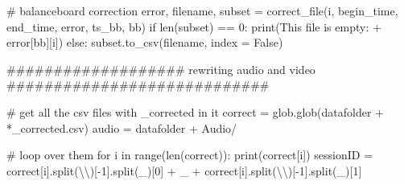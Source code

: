 \documentclass[
  letterpaper,
  DIV=11,
  numbers=noendperiod]{scrreprt}
\newenvironment{Shaded}{\begin{snugshade}}{\end{snugshade}}
\newcommand{\BuiltInTok}[1]{\textcolor[rgb]{0.00,0.23,0.31}{#1}}
\newcommand{\CharTok}[1]{\textcolor[rgb]{0.13,0.47,0.30}{#1}}
\newcommand{\CommentTok}[1]{\textcolor[rgb]{0.37,0.37,0.37}{#1}}
\newcommand{\ControlFlowTok}[1]{\textcolor[rgb]{0.00,0.23,0.31}{#1}}
\newcommand{\DecValTok}[1]{\textcolor[rgb]{0.68,0.00,0.00}{#1}}
\newcommand{\KeywordTok}[1]{\textcolor[rgb]{0.00,0.23,0.31}{#1}}
\newcommand{\NormalTok}[1]{\textcolor[rgb]{0.00,0.23,0.31}{#1}}
\newcommand{\OperatorTok}[1]{\textcolor[rgb]{0.37,0.37,0.37}{#1}}
\newcommand{\StringTok}[1]{\textcolor[rgb]{0.13,0.47,0.30}{#1}}
\newcommand{\VariableTok}[1]{\textcolor[rgb]{0.07,0.07,0.07}{#1}}
\begin{document}
\begin{Shaded}
\begin{Highlighting}[]
        \CommentTok{\# balanceboard correction}
\NormalTok{        error, filename, subset }\OperatorTok{=}\NormalTok{ correct\_file(i, begin\_time, end\_time, error, ts\_bb, }\StringTok{\textquotesingle{}bb\textquotesingle{}}\NormalTok{)}
        \ControlFlowTok{if} \BuiltInTok{len}\NormalTok{(subset) }\OperatorTok{==} \DecValTok{0}\NormalTok{:}
            \BuiltInTok{print}\NormalTok{(}\StringTok{\textquotesingle{}This file is empty: \textquotesingle{}} \OperatorTok{+}\NormalTok{ error[}\StringTok{\textquotesingle{}bb\textquotesingle{}}\NormalTok{][i])}
        \ControlFlowTok{else}\NormalTok{:}
\NormalTok{            subset.to\_csv(filename, index }\OperatorTok{=} \VariableTok{False}\NormalTok{)}
    
    \CommentTok{\#\#\#\#\#\#\#\#\#\#\#\#\#\#\#\#\#\#\# rewriting audio and video \#\#\#\#\#\#\#\#\#\#\#\#\#\#\#\#\#\#\#\#\#\#\#\#\#\#\#\#}

    \CommentTok{\# get all the csv files with \_corrected in it}
\NormalTok{    correct }\OperatorTok{=}\NormalTok{ glob.glob(datafolder }\OperatorTok{+} \StringTok{\textquotesingle{}*\_corrected.csv\textquotesingle{}}\NormalTok{)}
\NormalTok{    audio }\OperatorTok{=}\NormalTok{ datafolder }\OperatorTok{+} \StringTok{\textquotesingle{}Audio/\textquotesingle{}}
        
    \CommentTok{\# loop over them }
    \ControlFlowTok{for}\NormalTok{ i }\KeywordTok{in} \BuiltInTok{range}\NormalTok{(}\BuiltInTok{len}\NormalTok{(correct)):}
        \BuiltInTok{print}\NormalTok{(correct[i])}
\NormalTok{        sessionID }\OperatorTok{=}\NormalTok{ correct[i].split(}\StringTok{\textquotesingle{}}\CharTok{\textbackslash{}\textbackslash{}}\StringTok{\textquotesingle{}}\NormalTok{)[}\OperatorTok{{-}}\DecValTok{1}\NormalTok{].split(}\StringTok{\textquotesingle{}\_\textquotesingle{}}\NormalTok{)[}\DecValTok{0}\NormalTok{] }\OperatorTok{+} \StringTok{\textquotesingle{}\_\textquotesingle{}} \OperatorTok{+}\NormalTok{ correct[i].split(}\StringTok{\textquotesingle{}}\CharTok{\textbackslash{}\textbackslash{}}\StringTok{\textquotesingle{}}\NormalTok{)[}\OperatorTok{{-}}\DecValTok{1}\NormalTok{].split(}\StringTok{\textquotesingle{}\_\textquotesingle{}}\NormalTok{)[}\DecValTok{1}\NormalTok{]}


\end{Highlighting}
\end{Shaded}
\end{document}
